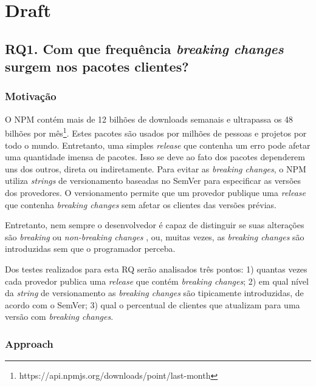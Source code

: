 \chapter{Draft}

\section{RQ1. Com que frequência \textit{breaking changes} surgem nos pacotes clientes?}
\label{sec:rq1}

\subsection{Motivação}
\label{mot:rq1}

O \Gls{NPM} contém mais de 12 bilhões de downloads semanais e ultrapassa os 48 bilhões por mês\footnote{https://api.npmjs.org/downloads/point/last-month}. Estes pacotes são usados por milhões de pessoas e projetos por todo o mundo. Entretanto, uma simples \textit{release} que contenha um erro pode afetar uma quantidade imensa de pacotes. Isso se deve ao fato dos pacotes dependerem uns dos outros, direta ou indiretamente. Para evitar as \textit{breaking changes}, o \Gls{NPM} utiliza \textit{strings} de versionamento baseadas no \Gls{SemVer} para especificar as versões dos provedores. O versionamento permite que um provedor publique uma \textit{release} que contenha \textit{breaking changes} sem afetar os clientes das versões prévias.

Entretanto, nem sempre o desenvolvedor é capaz de distinguir se suas alterações são \textit{breaking} ou \textit{non-breaking changes} \cite{noregrets2018}, ou, muitas vezes, as \textit{breaking changes} são introduzidas sem que o programador perceba.

Dos testes realizados para esta RQ serão analisados três pontos: 1) quantas vezes cada provedor publica uma \textit{release} que contém \textit{breaking changes}; 2) em qual nível da \textit{string} de versionamento as \textit{breaking changes} são tipicamente introduzidas, de acordo com o \Gls{SemVer}; 3) qual o percentual de clientes que atualizam para uma versão com \textit{breaking changes}.

\subsection{Approach}
\label{apr:rq1}


